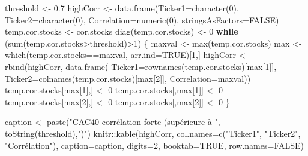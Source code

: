 \documentclass[
]{article}
\newenvironment{Shaded}{\begin{snugshade}}{\end{snugshade}}
\newcommand{\AttributeTok}[1]{\textcolor[rgb]{0.77,0.63,0.00}{#1}}
\newcommand{\ConstantTok}[1]{\textcolor[rgb]{0.00,0.00,0.00}{#1}}
\newcommand{\ControlFlowTok}[1]{\textcolor[rgb]{0.13,0.29,0.53}{\textbf{#1}}}
\newcommand{\DecValTok}[1]{\textcolor[rgb]{0.00,0.00,0.81}{#1}}
\newcommand{\FloatTok}[1]{\textcolor[rgb]{0.00,0.00,0.81}{#1}}
\newcommand{\FunctionTok}[1]{\textcolor[rgb]{0.00,0.00,0.00}{#1}}
\newcommand{\NormalTok}[1]{#1}
\newcommand{\OtherTok}[1]{\textcolor[rgb]{0.56,0.35,0.01}{#1}}
\newcommand{\SpecialCharTok}[1]{\textcolor[rgb]{0.00,0.00,0.00}{#1}}
\newcommand{\StringTok}[1]{\textcolor[rgb]{0.31,0.60,0.02}{#1}}
\begin{document}
\begin{Shaded}
\begin{Highlighting}[]
\NormalTok{threshold }\OtherTok{\textless{}{-}} \FloatTok{0.7}
\NormalTok{highCorr }\OtherTok{\textless{}{-}} \FunctionTok{data.frame}\NormalTok{(}\AttributeTok{Ticker1=}\FunctionTok{character}\NormalTok{(}\DecValTok{0}\NormalTok{), }
                       \AttributeTok{Ticker2=}\FunctionTok{character}\NormalTok{(}\DecValTok{0}\NormalTok{), }
                       \AttributeTok{Correlation=}\FunctionTok{numeric}\NormalTok{(}\DecValTok{0}\NormalTok{), }
                       \AttributeTok{stringsAsFactors=}\ConstantTok{FALSE}\NormalTok{)}
\NormalTok{temp.cor.stocks }\OtherTok{\textless{}{-}}\NormalTok{ cor.stocks}
\FunctionTok{diag}\NormalTok{(temp.cor.stocks) }\OtherTok{\textless{}{-}} \DecValTok{0}
\ControlFlowTok{while}\NormalTok{ (}\FunctionTok{sum}\NormalTok{(temp.cor.stocks}\SpecialCharTok{\textgreater{}}\NormalTok{threshold)}\SpecialCharTok{\textgreater{}}\DecValTok{1}\NormalTok{) \{}
\NormalTok{  maxval }\OtherTok{\textless{}{-}} \FunctionTok{max}\NormalTok{(temp.cor.stocks)}
\NormalTok{  max }\OtherTok{\textless{}{-}} \FunctionTok{which}\NormalTok{(temp.cor.stocks}\SpecialCharTok{==}\NormalTok{maxval, }\AttributeTok{arr.ind=}\ConstantTok{TRUE}\NormalTok{)[}\DecValTok{1}\NormalTok{,]}
\NormalTok{  highCorr }\OtherTok{\textless{}{-}} \FunctionTok{rbind}\NormalTok{(highCorr, }\FunctionTok{data.frame}\NormalTok{(}
    \AttributeTok{Ticker1=}\FunctionTok{rownames}\NormalTok{(temp.cor.stocks)[max[}\DecValTok{1}\NormalTok{]], }
    \AttributeTok{Ticker2=}\FunctionTok{colnames}\NormalTok{(temp.cor.stocks)[max[}\DecValTok{2}\NormalTok{]], }
    \AttributeTok{Correlation=}\NormalTok{maxval))}
\NormalTok{  temp.cor.stocks[max[}\DecValTok{1}\NormalTok{],] }\OtherTok{\textless{}{-}} \DecValTok{0}
\NormalTok{  temp.cor.stocks[,max[}\DecValTok{1}\NormalTok{]] }\OtherTok{\textless{}{-}} \DecValTok{0}
\NormalTok{  temp.cor.stocks[max[}\DecValTok{2}\NormalTok{],] }\OtherTok{\textless{}{-}} \DecValTok{0}
\NormalTok{  temp.cor.stocks[,max[}\DecValTok{2}\NormalTok{]] }\OtherTok{\textless{}{-}} \DecValTok{0}
\NormalTok{\}}

\NormalTok{caption }\OtherTok{\textless{}{-}} \FunctionTok{paste}\NormalTok{(}\StringTok{"CAC40 corrélation forte (supérieure à "}\NormalTok{, }
                 \FunctionTok{toString}\NormalTok{(threshold),}\StringTok{")"}\NormalTok{)}
\NormalTok{knitr}\SpecialCharTok{::}\FunctionTok{kable}\NormalTok{(highCorr, }
             \AttributeTok{col.names=}\FunctionTok{c}\NormalTok{(}\StringTok{"Ticker1"}\NormalTok{, }\StringTok{"Ticker2"}\NormalTok{, }\StringTok{"Corrélation"}\NormalTok{), }
             \AttributeTok{caption=}\NormalTok{caption,}
             \AttributeTok{digits=}\DecValTok{2}\NormalTok{, }\AttributeTok{booktab=}\ConstantTok{TRUE}\NormalTok{, }\AttributeTok{row.names=}\ConstantTok{FALSE}\NormalTok{)}
\end{Highlighting}
\end{Shaded}
\end{document}
